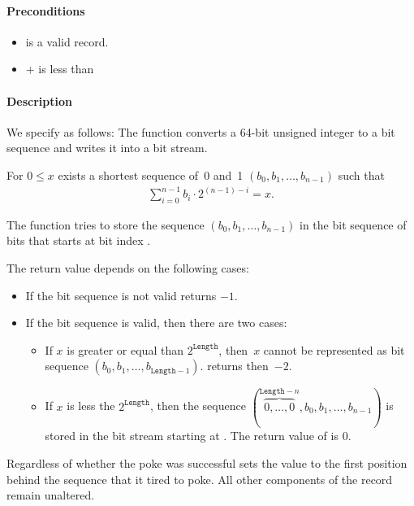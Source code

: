\paragraph{Preconditions}
\begin{itemize}
    \item  {} is a valid record.
    \item {} +  is less than 
\end{itemize}

\paragraph{Description}

We specify \pokenext as follows:
The function \poke converts a 64-bit unsigned integer to a bit sequence and 
writes it into a bit stream.

For $0 \leq x$ exists a shortest sequence of~0 and~1
$(b_0, b_1,\ldots,b_{n - 1})$
such that
\begin{align}
    \sum_{i=0}^{n-1} b_i \cdot 2^{(n - 1) - i} = x.
\end{align}

The function \pokenext tries to store the sequence $(b_0, b_1,\ldots,b_{n - 1})$
in the bit sequence of  bits that starts
at bit index .

The return value depends on  the following cases:
\begin{itemize}
    \item  If the bit sequence is not valid \peeknext  returns $-1$.
    \item  If the bit sequence is valid, then there are two cases:
\begin{itemize}
\item
If $x$ is greater or equal than $2^\mathtt{Length}$, then~$x$
cannot be represented as bit sequence $(b_0, b_1,\ldots,b_{\mathtt{Length} - 1})$.
\pokenext returns then~$-2$.

\item
If $x$ is less the $2^{\mathtt{Length}}$, then  the sequence
$(\overbrace{0,\ldots,0}^{\mathtt{Length}-n},b_0, b_1,\ldots,b_{n - 1})$
is stored in the bit stream starting at .
The return value of \pokenext is 0.

\end{itemize}
\end{itemize}

Regardless of whether the poke was successful \pokenext sets the value   to the first position behind the sequence that it tired to poke.
 All other components of the record  remain unaltered.



